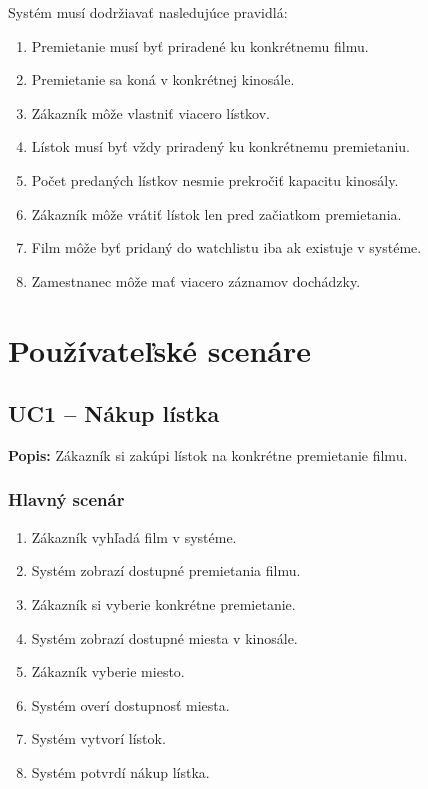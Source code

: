 \documentclass[11pt, a4paper]{article}
\begin{document}
Systém musí dodržiavať nasledujúce pravidlá:
\begin{enumerate}
    \item Premietanie musí byť priradené ku konkrétnemu filmu.
    \item Premietanie sa koná v konkrétnej kinosále.
    \item Zákazník môže vlastniť viacero lístkov.
    \item Lístok musí byť vždy priradený ku konkrétnemu premietaniu.
    \item Počet predaných lístkov nesmie prekročiť kapacitu kinosály.    
    \item Zákazník môže vrátiť lístok len pred začiatkom premietania.
    \item Film môže byť pridaný do watchlistu iba ak existuje v systéme.
    \item Zamestnanec môže mať viacero záznamov dochádzky.
\end{enumerate}

\section{Používateľské scenáre}
\label{sec:use-cases}

\subsection{UC1 -- Nákup lístka}
\textbf{Popis:} Zákazník si zakúpi lístok na konkrétne premietanie filmu.

\subsubsection*{Hlavný scenár}
\begin{enumerate}
    \item Zákazník vyhľadá film v systéme.
    \item Systém zobrazí dostupné premietania filmu.
    \item Zákazník si vyberie konkrétne premietanie.
    \item Systém zobrazí dostupné miesta v kinosále.
    \item Zákazník vyberie miesto.
    \item Systém overí dostupnosť miesta.
    \item Systém vytvorí lístok.
    \item Systém potvrdí nákup lístka.
\end{enumerate}
\end{document}

